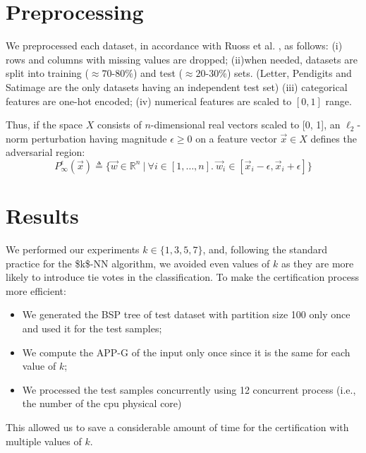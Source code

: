\section{Preprocessing}
\label{sec:results}

We preprocessed each dataset, in accordance with Ruoss et al. \cite{ruoss2020learning}, as follows: (i) rows and columns with missing values are dropped; (ii)when needed, datasets are split into training ($\approx 70$-$80\%$) and test ($\approx 20$-$30\%$) sets. (Letter, Pendigits and Satimage are the only datasets having an independent test set) (iii) categorical features are one-hot encoded; (iv) numerical features are scaled to $[0,1]$ range.

\noindent
Thus, if the space $X$ consists of $n$-dimensional real vectors scaled to [0, 1], an $\ell_2$-norm perturbation having magnitude $\epsilon \geq 0$ on a feature vector $\vec{x} \in X$ defines the adversarial region:
\begin{equation*}
	P^\epsilon_\infty(\vec{x}) \triangleq \{\vec{w} \in \mathbb{R}^n  ~|~ \forall i \in [1,\ldots,n].\: \vec{w}_i \in [\vec{x}_i - \epsilon, \vec{x}_i + \epsilon] \}
\end{equation*}


\section{Results}
\label{subsec:stab-rob-results}

We performed our experiments $k \in \{1, 3, 5, 7\}$, and, following the standard practice for the \acs{$k$-NN} algorithm, we avoided even values of $k$ as they are more likely to introduce tie votes in the classification. To make the certification process more efficient:
\begin{itemize}
	\item We generated the BSP tree of test dataset with partition size 100 only once and used it for the test samples;
	\item We compute the \acs{APP-G} of the input only once since it is the same for each value of $k$;
	\item We processed the test samples concurrently using 12 concurrent process (i.e., the number of the cpu physical core)
\end{itemize}

This allowed us to save a considerable amount of time for the certification with multiple values of $k$.

